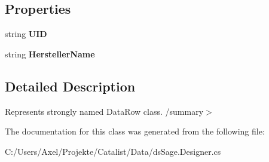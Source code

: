 \subsection*{Properties}
\begin{DoxyCompactItemize}
\item 
string {\bfseries U\+ID}\hypertarget{class_products_1_1_data_1_1ds_sage_1_1_hersteller_row_a9122d4895e3d5d4e2203ee49586b6dd5}{}\label{class_products_1_1_data_1_1ds_sage_1_1_hersteller_row_a9122d4895e3d5d4e2203ee49586b6dd5}

\item 
string {\bfseries Hersteller\+Name}\hypertarget{class_products_1_1_data_1_1ds_sage_1_1_hersteller_row_adea29e2b2a25fdd9b2d819f28bf8d41e}{}\label{class_products_1_1_data_1_1ds_sage_1_1_hersteller_row_adea29e2b2a25fdd9b2d819f28bf8d41e}

\end{DoxyCompactItemize}


\subsection{Detailed Description}
Represents strongly named Data\+Row class. /summary$>$ 

The documentation for this class was generated from the following file\+:\begin{DoxyCompactItemize}
\item 
C\+:/\+Users/\+Axel/\+Projekte/\+Catalist/\+Data/ds\+Sage.\+Designer.\+cs\end{DoxyCompactItemize}
